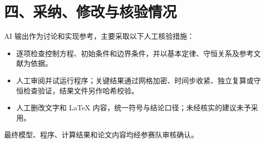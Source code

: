 \documentclass[UTF8,11pt,fontset=fandol]{ctexart}
\begin{document}
\section*{四、采纳、修改与核验情况}

AI 输出作为讨论和实现参考，主要采取以下人工核验措施：

\begin{itemize}
  \item 逐项检查控制方程、初始条件和边界条件，并以基本定律、守恒关系及参考文献为依据。
  \item 人工审阅并试运行程序；关键结果通过网格加密、时间步收紧、独立复算或守恒检查验证，结果文件另作哈希校验。
  \item 人工删改文字和 LaTeX 内容，统一符号与结论口径；未经核实的建议未予采用。
\end{itemize}

最终模型、程序、计算结果和论文内容均经参赛队审核确认。
\end{document}

